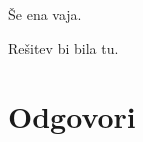 \begin{vaja}
  Še ena vaja.

  \begin{odgovor}
    Rešitev bi bila tu.
  \end{odgovor}
\end{vaja}




\section{Odgovori}
\label{sec:polinomi-odgovori}




